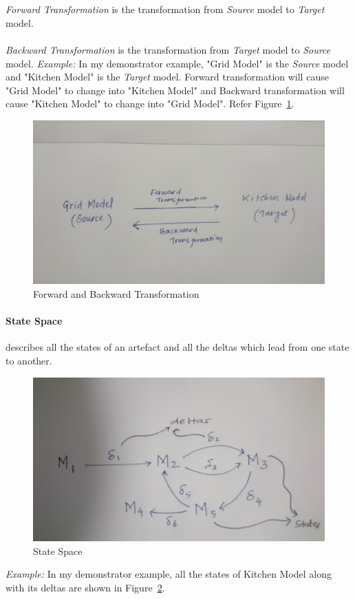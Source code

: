 \\\\\textit{Forward Transformation} is the transformation from \textit{Source} model to \textit{Target} model.
\\\\\textit{Backward Transformation} is the transformation from \textit{Target} model to \textit{Source} model.
\newline\newline\textit{Example:} In my demonstrator example, "Grid Model" is the \textit{Source} model and "Kitchen Model" is the \textit{Target} model. Forward transformation will cause "Grid Model" to change into "Kitchen Model" and Backward transformation will cause "Kitchen Model" to change into "Grid Model". Refer Figure~\ref{fig:FWDBKDTransformation}.
\begin{figure}
	\includegraphics[width=1\textwidth]{figures/FWDBKDTransformation}
	\caption{Forward and Backward Transformation}
	\label{fig:FWDBKDTransformation}
\end{figure}

\paragraph{State Space} describes all the states of an artefact and all the deltas which lead from one state to another.
\begin{figure}
	\includegraphics[width=1\textwidth]{figures/State_Space}
	\caption{State Space}
	\label{fig:StateSpace_Diagram}
\end{figure}
\newline\newline\textit{Example:} In my demonstrator example, all the states of Kitchen Model along with its deltas are shown in Figure~\ref{fig:StateSpace_Diagram}.

